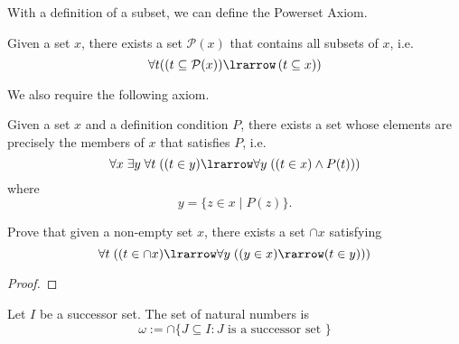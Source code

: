 \documentclass[notoc,notitlepage]{tufte-book}
\begin{document}
With a definition of a subset, we can define the Powerset Axiom.

\begin{axiom}
\label{axiom:powerset_axiom}
  Given a set $x$, there exists a set $\mathcal{P}(x)$ that contains all subsets of $x$, i.e.
  \begin{equation*}
    \forall t ( ( t \subseteq \mathcal{P}(x) ) \lrarrow \left( t \subseteq x \right) )
  \end{equation*}
\end{axiom}

We also require the following axiom.

\begin{axiom}
\label{axiom:bounded_separation_axiom}
Given a set $x$ and a definition condition $P$, there exists a set whose elements are precisely the members of $x$ that satisfies $P$, i.e.
  \begin{equation*}
    \forall x \; \exists y \; \forall t \; ( ( t \in y ) \lrarrow \forall y \; ( ( t \in x ) \land P(t) ) )
  \end{equation*}
  where
  \begin{equation*}
    y = \{ z \in x \mid P(z) \}.
  \end{equation*}
\end{axiom}

\begin{ex}
  Prove that given a non-empty set $x$, there exists a set $\cap x$ satisfying
  \begin{equation*}
    \forall t \; ( ( t \in \cap x ) \lrarrow \forall y \; ( ( y \in x ) \rarrow (t \in y) ) )
  \end{equation*}
\end{ex}

\begin{proof}
\end{proof}

\begin{defn}
\label{defn:natural_numbers}
Let $I$ be a successor set. The set of natural numbers is
  \begin{equation*}
    \omega := \cap \{ J \subseteq I : J \text{ is a successor set } \}
  \end{equation*}
\end{defn}
\end{document}
